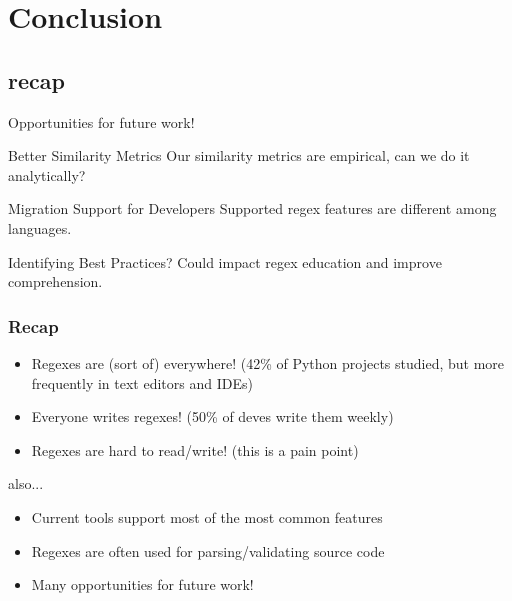 \section{Conclusion}
\subsection{recap}


\begin{frame}{Opportunities for future work!}

\begin{block}{Better Similarity Metrics}
Our similarity metrics are empirical, can we do it analytically?
\end{block}



\begin{block}{Migration Support for Developers}
Supported regex features are different among languages.
\end{block}


\begin{block}{Identifying Best Practices?}
Could impact regex education and improve comprehension. 
\end{block}




\end{frame}

\begin{frame}
\frametitle{Recap}

\begin{itemize}
\item Regexes are (sort of) everywhere! (42\% of Python projects studied, but more frequently in text editors and IDEs)
\item<2-> Everyone writes regexes! (50\% of  deves write them weekly)
\item<3-> Regexes are hard to read/write! (this is a pain point)
\end{itemize}

also...

\begin{itemize}
\item Current tools support most of the most common features
\item Regexes are often used for parsing/validating source code 
\item Many opportunities for future work!
\end{itemize}


\end{frame}


